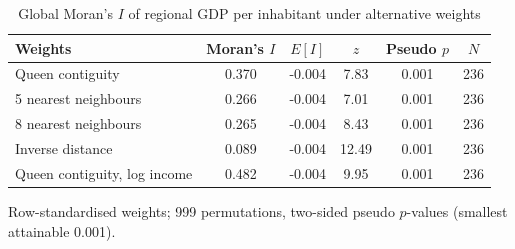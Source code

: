 \begin{table}[t]
\centering
\begin{threeparttable}
\caption{Global Moran's $I$ of regional GDP per inhabitant under alternative weights}
\label{tab:moran}
\begin{tabular}{lccccc}
\toprule
Weights & Moran's $I$ & $E[I]$ & $z$ & Pseudo $p$ & $N$ \\
\midrule
Queen contiguity & 0.370 & -0.004 & 7.83 & 0.001 & 236 \\
5 nearest neighbours & 0.266 & -0.004 & 7.01 & 0.001 & 236 \\
8 nearest neighbours & 0.265 & -0.004 & 8.43 & 0.001 & 236 \\
Inverse distance & 0.089 & -0.004 & 12.49 & 0.001 & 236 \\
Queen contiguity, log income & 0.482 & -0.004 & 9.95 & 0.001 & 236 \\
\bottomrule
\end{tabular}
\begin{tablenotes}[flushleft]
\footnotesize
\item Row-standardised weights; 999 permutations, two-sided pseudo $p$-values (smallest attainable 0.001).
\end{tablenotes}
\end{threeparttable}
\end{table}
